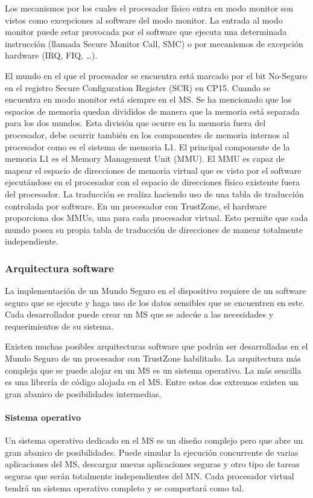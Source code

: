 Los mecanismos por los cuales el procesador físico entra en modo monitor son vistos como excepciones al software del modo monitor. La entrada al modo monitor puede estar provocada por el software que ejecuta una determinada instrucción (llamada Secure Monitor Call, SMC) o por mecanismos de excepción hardware (IRQ, FIQ, …). \newline

El mundo en el que el procesador se encuentra está marcado por el bit No-Seguro en el registro Secure Configuration Register (SCR) en CP15. Cuando se encuentra en modo monitor está siempre en el MS.
Se ha mencionado que los espacios de memoria quedan divididos de manera que la memoria está separada para los dos mundos. Esta división que ocurre en la memoria fuera del procesador, debe ocurrir también en los componentes de memoria internos al procesador como es el sistema de memoria L1. El principal componente de la memoria L1 es el Memory Management Unit (MMU). El MMU es capaz de mapear el espacio de direcciones de memoria virtual que es visto por el software ejecutándose en el procesador con el espacio de direcciones físico existente fuera del procesador. La traducción se realiza haciendo uso de una tabla de traducción controlada por software.
En un procesador con TrustZone, el hardware proporciona dos MMUs, una para cada procesador virtual. Esto permite que cada mundo posea su propia tabla de traducción de direcciones de manear totalmente independiente.

\subsubsection{Arquitectura software}

La implementación de un Mundo Seguro en el dispositivo requiere de un software seguro que se ejecute y haga uso de los datos sensibles que se encuentren en este. Cada desarrollador puede crear un MS que se adecúe a las necesidades y requerimientos de su sistema. \newline

Existen muchas posibles arquitecturas software que podrán ser desarrolladas en el Mundo Seguro de un procesador con TrustZone habilitado. La arquitectura más compleja que se puede alojar en un MS es un sistema operativo. La más sencilla es una librería de código alojada en el MS. Entre estos dos extremos existen un gran abanico de posibilidades intermedias.


\paragraph{Sistema operativo} 
Un sistema operativo dedicado en el MS es un diseño complejo pero que abre un gran abanico de posibilidades. Puede simular la ejecución concurrente de varias aplicaciones del MS, descargar nuevas aplicaciones seguras y otro tipo de tareas seguras que serán totalmente independientes del MN. Cada procesador virtual tendrá un sistema operativo completo y se comportará como tal.

